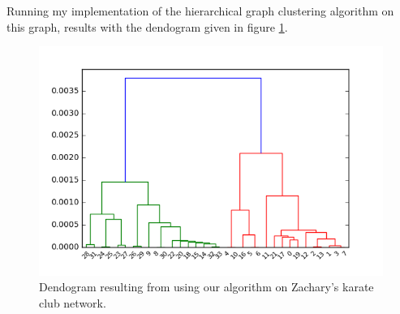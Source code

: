 \documentclass[12pt]{article}
\theoremstyle{definition}
\begin{document}
Running my implementation of the hierarchical graph clustering algorithm on this graph, results with the dendogram given in figure \ref{fig_karate_graph_dendogram}.
\begin{figure}[h]
	\includegraphics[scale=0.5]{karate_dendogram}
	\centering
	\caption{Dendogram resulting from using our algorithm on Zachary's karate club network.}
	\label{fig_karate_graph_dendogram}
\end{figure}
\end{document}
